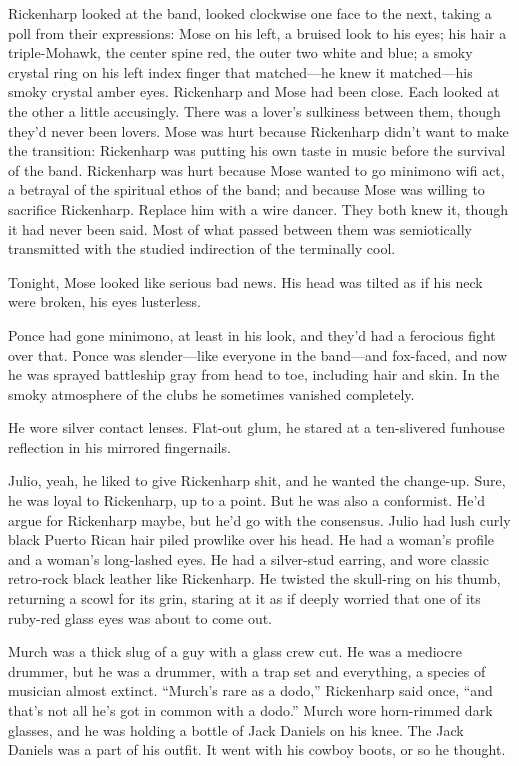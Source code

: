 Rickenharp looked at the band, looked clockwise one face to the next, taking a poll from their expressions: Mose on his left, a bruised look to his eyes; his hair a triple-Mohawk, the center spine red, the outer two white and blue; a smoky crystal ring on his left index finger that matched—he knew it matched—his smoky crystal amber eyes. Rickenharp and Mose had been close. Each looked at the other a little accusingly. There was a lover’s sulkiness between them, though they’d never been lovers. Mose was hurt because Rickenharp didn’t want to make the transition: Rickenharp was putting his own taste in music before the survival of the band. Rickenharp was hurt because Mose wanted to go minimono wifi act, a betrayal of the spiritual ethos of the band; and because Mose was willing to sacrifice Rickenharp. Replace him with a wire dancer. They both knew it, though it had never been said. Most of what passed between them was semiotically transmitted with the studied indirection of the terminally cool.

Tonight, Mose looked like serious bad news. His head was tilted as if his neck were broken, his eyes lusterless.

Ponce had gone minimono, at least in his look, and they’d had a ferocious fight over that. Ponce was slender—like everyone in the band—and fox-faced, and now he was sprayed battleship gray from head to toe, including hair and skin. In the smoky atmosphere of the clubs he sometimes vanished completely.

He wore silver contact lenses. Flat-out glum, he stared at a ten-slivered funhouse reflection in his mirrored fingernails.

Julio, yeah, he liked to give Rickenharp shit, and he wanted the change-up. Sure, he was loyal to Rickenharp, up to a point. But he was also a conformist. He’d argue for Rickenharp maybe, but he’d go with the consensus. Julio had lush curly black Puerto Rican hair piled prowlike over his head. He had a woman’s profile and a woman’s long-lashed eyes. He had a silver-stud earring, and wore classic retro-rock black leather like Rickenharp. He twisted the skull-ring on his thumb, returning a scowl for its grin, staring at it as if deeply worried that one of its ruby-red glass eyes was about to come out.

Murch was a thick slug of a guy with a glass crew cut. He was a mediocre drummer, but he was a drummer, with a trap set and everything, a species of musician almost extinct. “Murch’s rare as a dodo,” Rickenharp said once, “and that’s not all he’s got in common with a dodo.” Murch wore horn-rimmed dark glasses, and he was holding a bottle of Jack Daniels on his knee. The Jack Daniels was a part of his outfit. It went with his cowboy boots, or so he thought.


